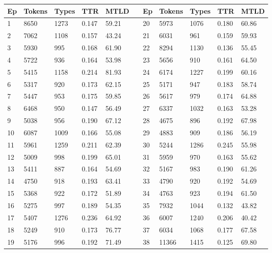 \documentclass[11pt]{article}
\begin{document}
\begin{center}
\small\setlength{\tabcolsep}{4pt}
\begin{tabular}{lllllllllll}
\toprule
Ep & Tokens & Types & TTR & MTLD &  & Ep & Tokens & Types & TTR & MTLD \\
\midrule
1 & 8650 & 1273 & 0.147 & 59.21 &  & 20 & 5973 & 1076 & 0.180 & 60.86 \\
2 & 7062 & 1108 & 0.157 & 43.24 &  & 21 & 6031 & 961 & 0.159 & 59.93 \\
3 & 5930 & 995 & 0.168 & 61.90 &  & 22 & 8294 & 1130 & 0.136 & 55.45 \\
4 & 5722 & 936 & 0.164 & 53.98 &  & 23 & 5656 & 910 & 0.161 & 64.50 \\
5 & 5415 & 1158 & 0.214 & 81.93 &  & 24 & 6174 & 1227 & 0.199 & 60.16 \\
6 & 5317 & 920 & 0.173 & 62.15 &  & 25 & 5171 & 947 & 0.183 & 58.74 \\
7 & 5447 & 953 & 0.175 & 59.85 &  & 26 & 5617 & 979 & 0.174 & 64.88 \\
8 & 6468 & 950 & 0.147 & 56.49 &  & 27 & 6337 & 1032 & 0.163 & 53.28 \\
9 & 5038 & 956 & 0.190 & 67.12 &  & 28 & 4675 & 896 & 0.192 & 67.98 \\
10 & 6087 & 1009 & 0.166 & 55.08 &  & 29 & 4883 & 909 & 0.186 & 56.19 \\
11 & 5961 & 1259 & 0.211 & 62.39 &  & 30 & 5244 & 1286 & 0.245 & 55.98 \\
12 & 5009 & 998 & 0.199 & 65.01 &  & 31 & 5959 & 970 & 0.163 & 55.62 \\
13 & 5411 & 887 & 0.164 & 54.69 &  & 32 & 5167 & 983 & 0.190 & 61.26 \\
14 & 4750 & 918 & 0.193 & 63.41 &  & 33 & 4790 & 920 & 0.192 & 54.69 \\
15 & 5368 & 922 & 0.172 & 51.89 &  & 34 & 4763 & 923 & 0.194 & 61.50 \\
16 & 5275 & 997 & 0.189 & 54.35 &  & 35 & 7932 & 1044 & 0.132 & 43.82 \\
17 & 5407 & 1276 & 0.236 & 64.92 &  & 36 & 6007 & 1240 & 0.206 & 40.42 \\
18 & 5249 & 910 & 0.173 & 76.77 &  & 37 & 6034 & 1068 & 0.177 & 67.58 \\
19 & 5176 & 996 & 0.192 & 71.49 &  & 38 & 11366 & 1415 & 0.125 & 69.80 \\
\bottomrule
\end{tabular}
\end{center}

\FloatBarrier
\needspace{0.9\textheight}
\end{document}
